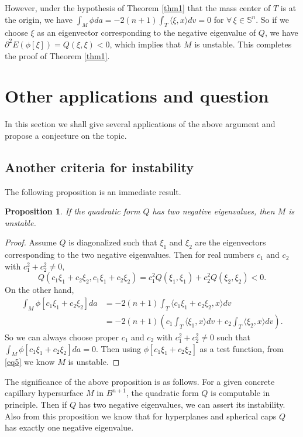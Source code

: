 \documentclass[11pt,reqno]{amsart}
\newtheorem{prop}[thm]{Proposition}
\theoremstyle{definition}
\begin{document}
However, under the hypothesis of Theorem \ref{thm1} that the mass center of $T$ is at the origin, we have $\int_M \phi da=-2(n+1)\int_T \langle \xi,x\rangle dv=0$ for $\forall\, \xi \in{\mathbb S}^n$. So if we choose $\xi$ as an eigenvector corresponding to the negative eigenvalue of $Q$, we have ${\partial}^2 E(\phi[\xi])=Q(\xi,\xi)<0$, which implies that $M$ is unstable. This completes the proof of Theorem \ref{thm1}.

\section{Other applications and question}\label{sec4}

In this section we shall give several applications of the above argument and propose a conjecture on the topic.

\subsection{Another criteria for instability}

The following proposition is an immediate result.
\begin{prop}
If the quadratic form $Q$ has two negative eigenvalues, then $M$ is unstable.
\end{prop}
\begin{proof}
Assume $Q$ is diagonalized such that $\xi_1$ and $\xi_2$ are the eigenvectors corresponding to the two negative eigenvalues. Then for real numbers $c_1$ and $c_2$ with $c_1^2+c_2^2\neq 0$,
\begin{equation}\label{eq5}
Q(c_1\xi_1+c_2\xi_2,c_1\xi_1+c_2\xi_2)=c_1^2Q(\xi_1,\xi_1)+c_2^2Q(\xi_2,\xi_2)<0.
\end{equation}
On the other hand,
\begin{align*}
\int_M \phi[c_1\xi_1+c_2\xi_2] da&=-2(n+1)\int_T \langle c_1\xi_1+c_2\xi_2,x\rangle dv\\
                                 &=-2(n+1)(c_1\int_T \langle \xi_1,x\rangle dv+c_2\int_T \langle \xi_2,x\rangle dv).
\end{align*}
So we can always choose proper $c_1$ and $c_2$ with $c_1^2+c_2^2\neq 0$ such that $\int_M \phi[c_1\xi_1+c_2\xi_2] da=0$. Then using $\phi[c_1\xi_1+c_2\xi_2]$ as a test function, from \eqref{eq5} we know $M$ is unstable.

\end{proof}
The significance of the above proposition is as follows. For a given concrete capillary hypersurface $M$ in $B^{n+1}$, the quadratic form $Q$ is computable in principle. Then if $Q$ has two negative eigenvalues, we can assert its instability. Also from this proposition we know that for hyperplanes and spherical caps $Q$ has exactly one negative eigenvalue.
\end{document}
